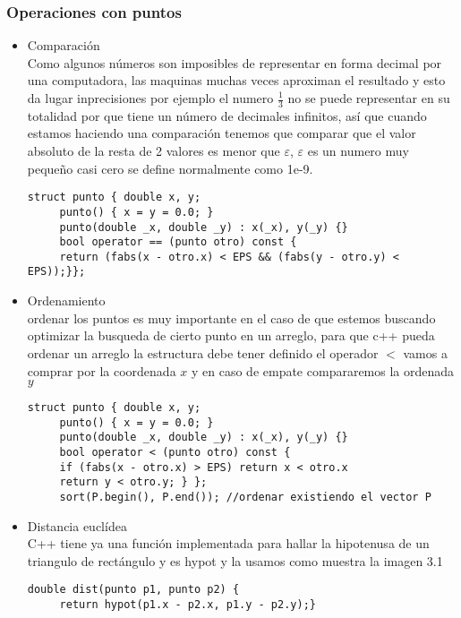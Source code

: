 \subsubsection{Operaciones con puntos}
\begin{itemize}
	\item Comparación
	 \\
	 Como algunos números son imposibles de representar en forma decimal por una computadora, las maquinas muchas veces aproximan el
	 resultado y esto da lugar inprecisiones  por ejemplo el numero $\frac{1}{3}$ no se puede representar en su totalidad por que tiene un número
	 de decimales infinitos, así que cuando estamos haciendo una comparación tenemos que comparar que  el valor absoluto de la resta de
	 2 valores es menor que $\varepsilon$, $\varepsilon$ es un numero muy pequeño casi cero se define normalmente como  1e-9.
	 \\
	 \begin{lstlisting}[style=C]
	 struct punto { double x, y;
	 punto() { x = y = 0.0; }
	 punto(double _x, double _y) : x(_x), y(_y) {}
	 bool operator == (punto otro) const {
	 return (fabs(x - otro.x) < EPS && (fabs(y - otro.y) < EPS));}};
	 \end{lstlisting}
	 \item Ordenamiento
	 \\
	 ordenar los puntos es muy importante en el caso de que estemos buscando optimizar la busqueda de cierto punto en un arreglo, para
	 que c++ pueda ordenar un arreglo la estructura debe tener definido el operador $<$ vamos a comprar por la coordenada $x$ y en caso
	 de empate compararemos la ordenada $y$
	 \begin{lstlisting}[style=C]
	 struct punto { double x, y;
	 punto() { x = y = 0.0; }
	 punto(double _x, double _y) : x(_x), y(_y) {}
	 bool operator < (punto otro) const {
	 if (fabs(x - otro.x) > EPS) return x < otro.x
	 return y < otro.y; } };
	 sort(P.begin(), P.end()); //ordenar existiendo el vector P
	 \end{lstlisting}
	 \item Distancia euclídea
	 \\
	 C++ tiene ya una función implementada para hallar la hipotenusa de un triangulo de rectángulo y es hypot y la usamos como muestra la imagen 3.1
	 \\
	 \begin{lstlisting}[style=C]
	 double dist(punto p1, punto p2) {
	 return hypot(p1.x - p2.x, p1.y - p2.y);}
	 \end{lstlisting}
\end{itemize}
